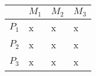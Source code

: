   \begin{tabular}{ |K{2cm} | K{2cm} | K{2cm} | K{2cm}|}
	\hline
	 & $M_1$ & $M_2$ & $M_3$ \\ \hline
	$P_1$ & x & x & x \\ \hline
	$P_2$ & x & x & x \\ \hline
	$P_3$ & x & x & x \\ \hline
\end{tabular}
